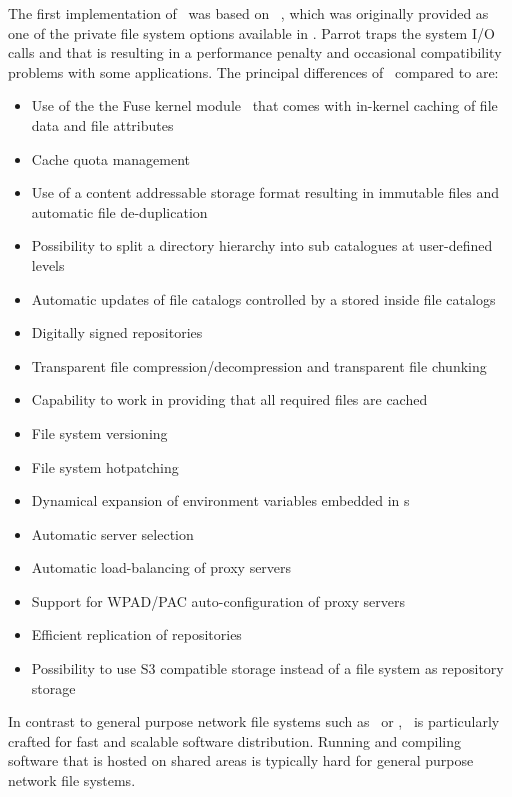 The first implementation of \cvmfs\ was based on ~\cite{parrot05, growfs09}, which was originally provided as one of the private file system options available in . 
Parrot traps the system I/O calls and that is resulting in a performance penalty and occasional compatibility problems with some applications. 
The principal differences of \cvmfs\ compared to  are:
\begin{itemize}
	\item Use of the the Fuse kernel module~\cite{fuse} that comes with in-kernel caching of file data and file attributes
	\item Cache quota management
	\item Use of a content addressable storage format resulting in immutable files and automatic file de-duplication
	\item Possibility to split a directory hierarchy into sub catalogues at user-defined levels
	\item Automatic updates of file catalogs controlled by a  stored inside file catalogs
	\item Digitally signed repositories
	\item Transparent file compression/decompression and transparent file chunking
	\item Capability to work in  providing that all required files are cached
	\item File system versioning
	\item File system hotpatching
	\item Dynamical expansion of environment variables embedded in s
	\item Automatic server selection
	\item Automatic load-balancing of proxy servers
	\item Support for WPAD/PAC auto-configuration of proxy servers
	\item Efficient replication of repositories
	\item Possibility to use S3 compatible storage instead of a file system as repository storage
\end{itemize}

In contrast to general purpose network file systems such as \nfs\ or \afs, \cvmfs\ is particularly crafted for fast and scalable software distribution.
Running and compiling software that is hosted on shared areas is typically hard for general purpose network file systems.


